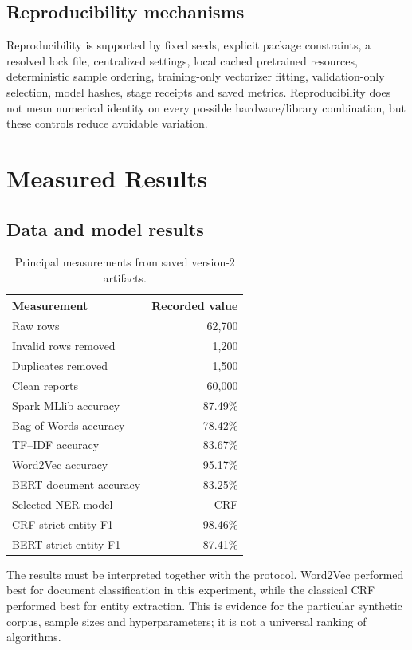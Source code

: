 \documentclass[12pt,a4paper]{report}
\begin{document}
\section{Reproducibility mechanisms}

Reproducibility is supported by fixed seeds, explicit package constraints, a resolved lock file, centralized settings, local cached pretrained resources, deterministic sample ordering, training-only vectorizer fitting, validation-only selection, model hashes, stage receipts and saved metrics. Reproducibility does not mean numerical identity on every possible hardware/library combination, but these controls reduce avoidable variation.

\chapter{Measured Results}

\section{Data and model results}

\begin{table}[H]
\centering
\begin{tabular}{lr}
\toprule
Measurement & Recorded value \\
\midrule
Raw rows & 62,700 \\
Invalid rows removed & 1,200 \\
Duplicates removed & 1,500 \\
Clean reports & 60,000 \\
Spark MLlib accuracy & 87.49\% \\
Bag of Words accuracy & 78.42\% \\
TF--IDF accuracy & 83.67\% \\
Word2Vec accuracy & 95.17\% \\
BERT document accuracy & 83.25\% \\
Selected NER model & CRF \\
CRF strict entity F1 & 98.46\% \\
BERT strict entity F1 & 87.41\% \\
\bottomrule
\end{tabular}
\caption{Principal measurements from saved version-2 artifacts.}
\end{table}

The results must be interpreted together with the protocol. Word2Vec performed best for document classification in this experiment, while the classical CRF performed best for entity extraction. This is evidence for the particular synthetic corpus, sample sizes and hyperparameters; it is not a universal ranking of algorithms.
\end{document}
